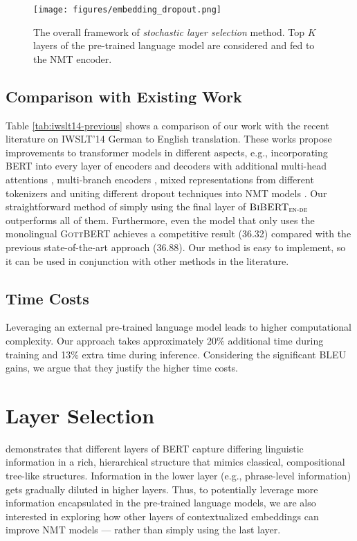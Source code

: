 \documentclass[11pt]{article}
\begin{document}
\begin{figure*}[ht]
    \centering
    \texttt{[image: figures/embedding\_dropout.png]}
    \caption{The overall framework of \textit{stochastic layer selection} method. Top $K$ layers of the  pre-trained language model are considered and fed to the NMT encoder. }
    \label{fig:dropout}
\end{figure*}

\subsection{Comparison with Existing Work}
Table \ref{tab:iwslt14-previous} shows a comparison of our work with the recent literature on IWSLT'14 German to English translation. These works propose improvements to transformer models in different aspects, e.g., incorporating BERT into every layer of encoders and decoders with additional multi-head attentions \citep{Zhu2020Incorporating}, multi-branch encoders \citep{fan2020multi}, mixed representations from different tokenizers \citep{wu2020sequence} and uniting different dropout techniques into NMT models \citep{wu-etal-2021-unidrop}. Our straightforward method of simply using the final layer of $\textsc{BiBERT}_\textsc{en-de}$ outperforms all of them. Furthermore, even the model that only uses the monolingual \textsc{GottBERT} achieves a competitive result (36.32) compared with the previous state-of-the-art approach (36.88). Our method is easy to implement, so it can be used in conjunction with other methods in the literature.

\subsection{Time Costs}
Leveraging an external pre-trained language model leads to higher computational complexity. Our approach takes approximately 20\% additional time during training and 13\% extra time during inference. Considering the significant BLEU gains, we argue that they justify the higher time costs. 

\section{Layer Selection}
\label{sec:layer-dropout}
\citet{jawahar-etal-2019-bert} demonstrates that different layers of BERT capture differing linguistic information in a rich, hierarchical structure that mimics classical, compositional tree-like structures. Information in the lower layer (e.g., phrase-level information) gets gradually diluted in higher layers. Thus, to potentially leverage more information encapsulated in the pre-trained language models, we are also interested in exploring how other layers  of contextualized embeddings can improve NMT models --- rather than simply using the last layer. 
\end{document}
